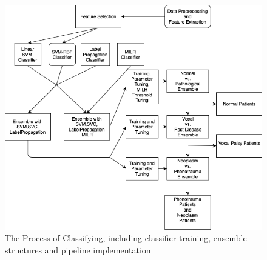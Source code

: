 	\begin{figure}[!htbp]
		\begin{center}
			\includegraphics[scale=0.35]{Diagram_3.png}
		\end{center}
		\caption{The Process of Classifying, including classifier training, ensemble structures and pipeline implementation}
	\end{figure}




